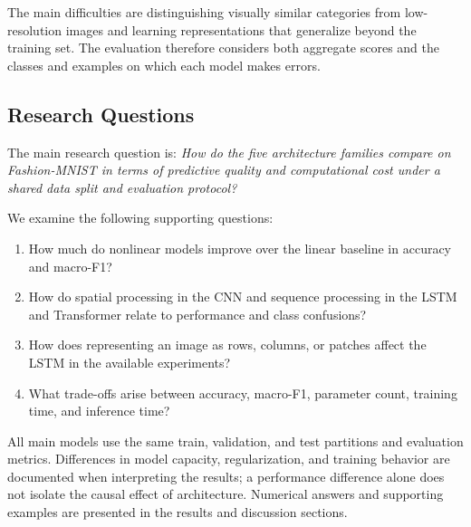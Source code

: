 The main difficulties are distinguishing visually similar categories from low-resolution images and learning representations that generalize beyond the training set. The evaluation therefore considers both aggregate scores and the classes and examples on which each model makes errors.

\subsection{Research Questions}

The main research question is: \emph{How do the five architecture families compare on Fashion-MNIST in terms of predictive quality and computational cost under a shared data split and evaluation protocol?}

We examine the following supporting questions:
\begin{enumerate}
    \item How much do nonlinear models improve over the linear baseline in accuracy and macro-F1?
    \item How do spatial processing in the CNN and sequence processing in the LSTM and Transformer relate to performance and class confusions?
    \item How does representing an image as rows, columns, or patches affect the LSTM in the available experiments?
    \item What trade-offs arise between accuracy, macro-F1, parameter count, training time, and inference time?
\end{enumerate}

All main models use the same train, validation, and test partitions and evaluation metrics. Differences in model capacity, regularization, and training behavior are documented when interpreting the results; a performance difference alone does not isolate the causal effect of architecture. Numerical answers and supporting examples are presented in the results and discussion sections.
